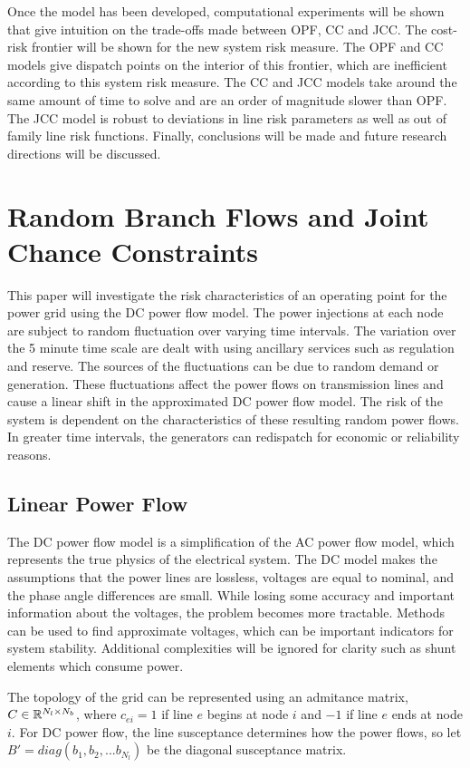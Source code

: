 Once the model has been developed, computational experiments will be shown that give intuition on the trade-offs made between OPF, CC and JCC.  The cost-risk frontier will be shown for the new system risk measure.  The OPF and CC models give dispatch points on the interior of this frontier, which are inefficient according to this system risk measure.  The CC and JCC models take around the same amount of time to solve and are an order of magnitude slower than OPF.  The JCC model is robust to deviations in line risk parameters as well as out of family line risk functions.  Finally, conclusions will be made and future research directions will be discussed.


\section{Random Branch Flows and Joint Chance Constraints} 
This paper will investigate the risk characteristics of an operating point for the power grid using the DC power flow model.  The power injections at each node are subject to random fluctuation over varying time intervals.  The variation over the 5 minute time scale are dealt with using ancillary services such as regulation and reserve.  The sources of the fluctuations can be due to random demand or generation.  These fluctuations affect the power flows on transmission lines and cause a linear shift in the approximated DC power flow model.  The risk of the system is dependent on the characteristics of these resulting random power flows.  In greater time intervals, the generators can redispatch for economic or reliability reasons.

\subsection{Linear Power Flow}
The DC power flow model is a simplification of the AC power flow model, which represents the true physics of the electrical system.  The DC model makes the assumptions that the power lines are lossless, voltages are equal to nominal, and the phase angle differences are small.  While losing some accuracy and important information about the voltages, the problem becomes more tractable.  Methods can be used to find approximate voltages, which can be important indicators for system stability.  Additional complexities will be ignored for clarity such as shunt elements which consume power.

The topology of the grid can be represented using an admitance matrix, $C \in \mathbb{R}^{N_l \times N_b}$, where $c_{ei}=1$ if line $e$ begins at node $i$ and $-1$ if line $e$ ends at node $i$.  For DC power flow, the line susceptance determines how the power flows, so let $B'=diag\left(b_1,b_2,...b_{N_l}\right)$ be the diagonal susceptance matrix.  


